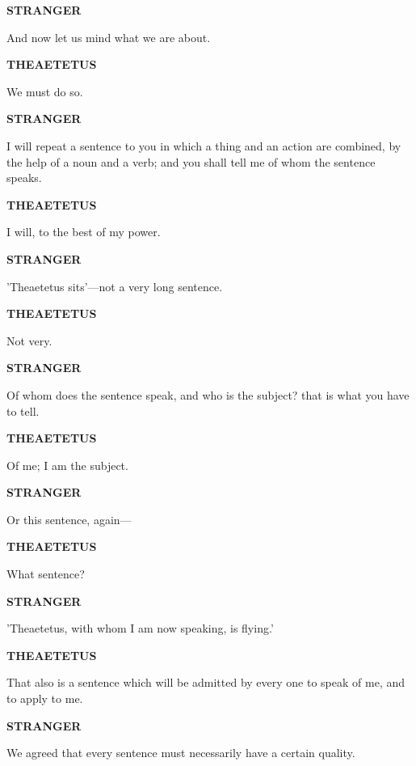 \documentclass[11pt,letter]{article}
\begin{document}
\par \textbf{STRANGER}
\par   And now let us mind what we are about.

\par \textbf{THEAETETUS}
\par   We must do so.

\par \textbf{STRANGER}
\par   I will repeat a sentence to you in which a thing and an action are combined, by the help of a noun and a verb; and you shall tell me of whom the sentence speaks.

\par \textbf{THEAETETUS}
\par   I will, to the best of my power.

\par \textbf{STRANGER}
\par   'Theaetetus sits'—not a very long sentence.

\par \textbf{THEAETETUS}
\par   Not very.

\par \textbf{STRANGER}
\par   Of whom does the sentence speak, and who is the subject? that is what you have to tell.

\par \textbf{THEAETETUS}
\par   Of me; I am the subject.

\par \textbf{STRANGER}
\par   Or this sentence, again—

\par \textbf{THEAETETUS}
\par   What sentence?

\par \textbf{STRANGER}
\par   'Theaetetus, with whom I am now speaking, is flying.'

\par \textbf{THEAETETUS}
\par   That also is a sentence which will be admitted by every one to speak of me, and to apply to me.

\par \textbf{STRANGER}
\par   We agreed that every sentence must necessarily have a certain quality.
\end{document}
